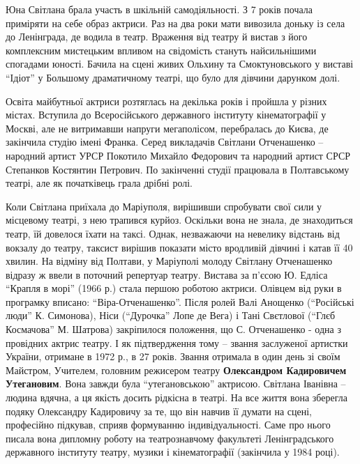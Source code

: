 Юна Світлана брала участь в шкільній самодіяльності. З 7 років почала приміряти
на себе образ актриси. Раз на два роки мати вивозила доньку із села до
Ленінграда, де водила в театр. Враження від театру й вистав з його комплексним
мистецьким впливом на свідомість стануть найсильнішими спогадами юності. Бачила
на сцені живих Ольхину та Смоктуновського у виставі \enquote{Ідіот} у Большому
драматичному театрі, що було для дівчини дарунком долі.


Освіта майбутньої актриси розтяглась на декілька років і пройшла у різних
містах. Вступила до Всеросійського державного інституту кінематографії у
Москві, але не витримавши напруги мегаполісом, перебралась до Києва, де
закінчила студію імені Франка. Серед викладачів Світлани Отченашенко – народний
артист УРСР Покотило Михайло Федорович та народний артист СРСР Степанков
Костянтин Петрович. По закінченні студії працювала в Полтавському театрі, але
як початківець грала дрібні ролі.


Коли Світлана приїхала до Маріуполя, вирішивши спробувати свої сили у місцевому
театрі, з нею трапився курйоз. Оскільки вона не знала, де знаходиться театр, їй
довелося їхати на таксі. Однак, незважаючи на невелику відстань від вокзалу до
театру, таксист вирішив показати місто вродливій дівчині і катав її 40 хвилин.
На відміну від Полтави, у Маріуполі молоду Світлану Отченашенко відразу ж ввели
в поточний репертуар театру. Вистава за п'єсою Ю. Едліса \enquote{Крапля в
морі} (1966 р.) стала першою роботою актриси. Олівцем від руки в програмку
вписано: \enquote{Віра-Отченашенко}. Після ролей Валі Анощенко
(\enquote{Російські люди} К. Симонова), Ніси (\enquote{Дурочка} Лопе де Вега) і
Тані Свєтлової (\enquote{Глєб Космачова} М. Шатрова) закріпилося положення, що
С. Отченашенко - одна з провідних актрис театру. І як підтвердження тому –
звання заслуженої артистки України, отримане в 1972 р., в 27 років. Звання
отримала в один день зі своїм Майстром, Учителем, головним режисером театру
\textbf{Олександром Кадировичем Утегановим}. Вона завжди була
\enquote{утегановською} актрисою. Світлана Іванівна – людина вдячна, а ця
якість досить рідкісна в театрі. На все життя вона зберегла подяку Олександру
Кадировичу за те, що він навчив її думати на сцені, професійно підкував, сприяв
формуванню індивідуальності. Саме про нього писала вона дипломну роботу на
театрознавчому факультеті Ленінградського державного інституту театру, музики і
кінематографії (закінчила у 1984 році).

